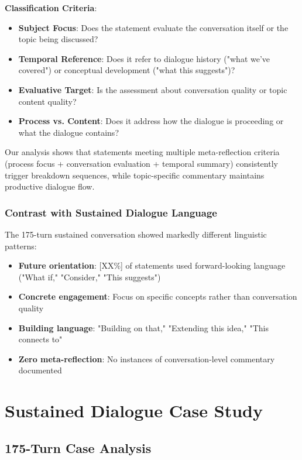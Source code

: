 \documentclass[11pt,letterpaper]{article}
\begin{document}
\textbf{Classification Criteria}:
\begin{itemize}
    \item \textbf{Subject Focus}: Does the statement evaluate the conversation itself or the topic being discussed?
    \item \textbf{Temporal Reference}: Does it refer to dialogue history ("what we've covered") or conceptual development ("what this suggests")?
    \item \textbf{Evaluative Target}: Is the assessment about conversation quality or topic content quality?
    \item \textbf{Process vs. Content}: Does it address how the dialogue is proceeding or what the dialogue contains?
\end{itemize}

Our analysis shows that statements meeting multiple meta-reflection criteria (process focus + conversation evaluation + temporal summary) consistently trigger breakdown sequences, while topic-specific commentary maintains productive dialogue flow.

\subsubsection{Contrast with Sustained Dialogue Language}

The 175-turn sustained conversation showed markedly different linguistic patterns:
\begin{itemize}
    \item \textbf{Future orientation}: [XX\%] of statements used forward-looking language ("What if," "Consider," "This suggests")
    \item \textbf{Concrete engagement}: Focus on specific concepts rather than conversation quality
    \item \textbf{Building language}: "Building on that," "Extending this idea," "This connects to"
    \item \textbf{Zero meta-reflection}: No instances of conversation-level commentary documented
\end{itemize}

\section{Sustained Dialogue Case Study}
\label{app:sustained}

\subsection{175-Turn Case Analysis}
\end{document}

